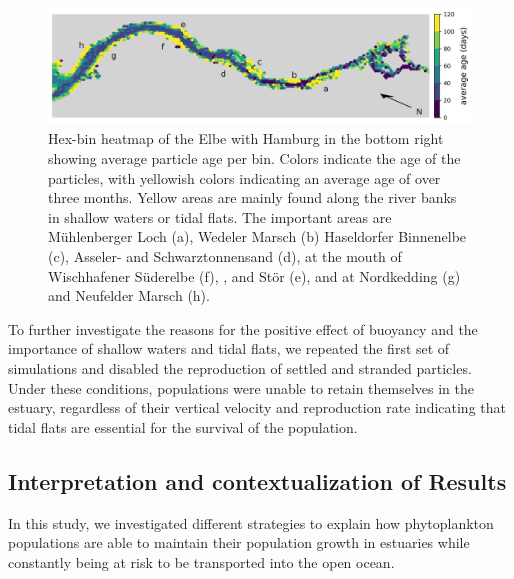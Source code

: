 \documentclass[npg, manuscript]{copernicus}
\begin{document}
\begin{figure}
    \includegraphics[width=12cm]{age_hexbin.png}
    \caption[]{
        Hex-bin heatmap of the Elbe with Hamburg in the bottom right showing average particle age per bin.
        Colors indicate the age of the particles, with yellowish colors indicating an average age of over three months.
        Yellow areas are mainly found along the river banks in shallow waters or tidal flats.
        The important areas are Mühlenberger Loch (a), Wedeler Marsch (b) Haseldorfer Binnenelbe (c), Asseler- and Schwarztonnensand (d), at the mouth of Wischhafener Süderelbe (f), , and Stör (e), and at Nordkedding (g) and Neufelder Marsch (h).
    }
    \label{fig:migration-long-vs-short-heatmap}
\end{figure}

To further investigate the reasons for the positive effect of buoyancy and the importance of shallow waters and tidal flats, we repeated the first set of simulations and disabled the reproduction of settled and stranded particles.
Under these conditions, populations were unable to retain themselves in the estuary, regardless of their vertical velocity and reproduction rate indicating that tidal flats are essential for the survival of the population.




\subsection{Interpretation and contextualization of Results}

In this study, we investigated different strategies to explain how phytoplankton populations are able to maintain their population growth in estuaries while constantly being at risk to be transported into the open ocean.
\end{document}

